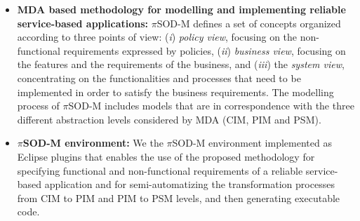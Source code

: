 \begin{itemize}
  \item \textbf{MDA based methodology for modelling and implementing reliable
  service-based applications:} $\pi$SOD-M defines a set of concepts organized
  according to three points of view: (\textit{i})  \textit{policy view}, focusing on the non-functional requirements expressed by policies,
(\textit{ii}) \textit{business view}, focusing on the features and the
requirements of the business, and (\textit{iii}) the \textit{system
view}, concentrating on the functionalities and processes that need to be implemented
in order to satisfy the business requirements. The modelling process of
$\pi$SOD-M includes models that are in correspondence with the three
different abstraction levels considered by MDA (CIM, PIM and PSM).
    \item \textbf{$\pi$SOD-M environment:} We the $\pi$SOD-M environment
    implemented as Eclipse plugins that enables the use of the proposed
    methodology for specifying functional and non-functional requirements of a
    reliable service-based application and for semi-automatizing the
    transformation processes from CIM to PIM and PIM to PSM levels, and then
    generating executable code.
  
\end{itemize}
  

